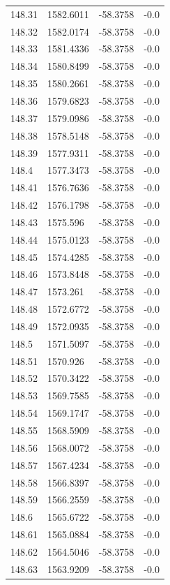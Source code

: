 \begin{table}[H]
\begin{tabular}{llll}
148.31 & 1582.6011 & -58.3758 & -0.0 \\
148.32 & 1582.0174 & -58.3758 & -0.0 \\
148.33 & 1581.4336 & -58.3758 & -0.0 \\
148.34 & 1580.8499 & -58.3758 & -0.0 \\
148.35 & 1580.2661 & -58.3758 & -0.0 \\
148.36 & 1579.6823 & -58.3758 & -0.0 \\
148.37 & 1579.0986 & -58.3758 & -0.0 \\
148.38 & 1578.5148 & -58.3758 & -0.0 \\
148.39 & 1577.9311 & -58.3758 & -0.0 \\
148.4 & 1577.3473 & -58.3758 & -0.0 \\
148.41 & 1576.7636 & -58.3758 & -0.0 \\
148.42 & 1576.1798 & -58.3758 & -0.0 \\
148.43 & 1575.596 & -58.3758 & -0.0 \\
148.44 & 1575.0123 & -58.3758 & -0.0 \\
148.45 & 1574.4285 & -58.3758 & -0.0 \\
148.46 & 1573.8448 & -58.3758 & -0.0 \\
148.47 & 1573.261 & -58.3758 & -0.0 \\
148.48 & 1572.6772 & -58.3758 & -0.0 \\
148.49 & 1572.0935 & -58.3758 & -0.0 \\
148.5 & 1571.5097 & -58.3758 & -0.0 \\
148.51 & 1570.926 & -58.3758 & -0.0 \\
148.52 & 1570.3422 & -58.3758 & -0.0 \\
148.53 & 1569.7585 & -58.3758 & -0.0 \\
148.54 & 1569.1747 & -58.3758 & -0.0 \\
148.55 & 1568.5909 & -58.3758 & -0.0 \\
148.56 & 1568.0072 & -58.3758 & -0.0 \\
148.57 & 1567.4234 & -58.3758 & -0.0 \\
148.58 & 1566.8397 & -58.3758 & -0.0 \\
148.59 & 1566.2559 & -58.3758 & -0.0 \\
148.6 & 1565.6722 & -58.3758 & -0.0 \\
148.61 & 1565.0884 & -58.3758 & -0.0 \\
148.62 & 1564.5046 & -58.3758 & -0.0 \\
148.63 & 1563.9209 & -58.3758 & -0.0 \\

\end{tabular}
\end{table}
